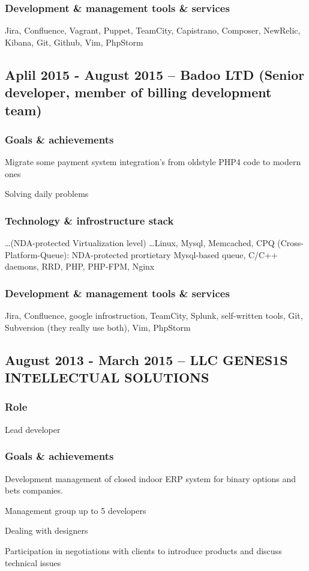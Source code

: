 \documentclass[9pt, a4paper, english]{extarticle}
\begin{document}
    \subsubsection* {Development \& management tools \& services}
      Jira, Confluence, Vagrant, Puppet, TeamCity, Capistrano, Composer,
      NewRelic, Kibana, Git, Github, Vim, PhpStorm


  \subsection* {Aplil 2015 - August 2015 -- \textbf{Badoo LTD} (Senior developer, member of billing development team)}
    \subsubsection* {Goals \& achievements}
      \begin {list}{\textbullet}{\itemsep=0mm}
        \item Migrate some payment system integration's from oldstyle PHP4 code to modern ones
        \item Solving daily problems
      \end{list}
    \subsubsection* {Technology \& infrostructure stack}
      \ldots (NDA-protected Virtualization level) \ldots Linux, Mysql, Memcached,
      CPQ (Cross-Platform-Queue): NDA-protected prortietary Mysql-based queue,
      C/C++ daemons, RRD, PHP, PHP-FPM, Nginx
    \subsubsection* {Development \& management tools \& services}
      Jira, Confluence, google infrostruction, TeamCity, Splunk, self-written
      tools, Git, Subversion (they really use both), Vim, PhpStorm


  \subsection* {August 2013 - March 2015 -- \textbf{LLC GENES1S INTELLECTUAL SOLUTIONS}}
    \subsubsection* {Role}
      Lead developer
    \subsubsection* {Goals \& achievements}
      \begin {list}{\textbullet}{\itemsep=0mm}
        \item Development management of closed indoor ERP system for binary options and bets companies.
        \item Management group up to 5 developers
        \item Dealing with designers
        \item Participation in negotiations with clients to introduce products and discuss technical issues
      \end{list}
\end{document}
